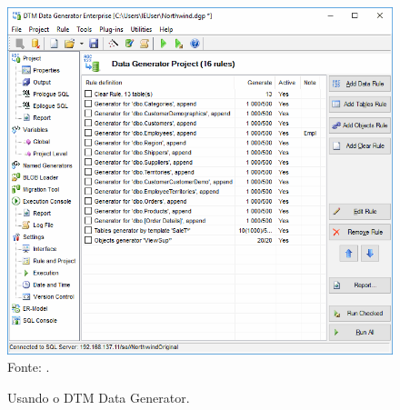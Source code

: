\documentclass[
	12pt,				%
	openright,			%
	oneside,			%
	a4paper,			%
	english,			%
	brazil				%
	]{abntex2}
\begin{document}
		\begin{figure}[h!]
			\centering
			\caption{Usando o DTM Data Generator.}
			\includegraphics[width=\linewidth]{./figures/TrabalhosRelacionados/DTMDataGenerator.png}
			\label{fig:DTMDG}
			\footnotesize Fonte: \cite{DTMDataGenerator}.
		\end{figure}
\end{document}

